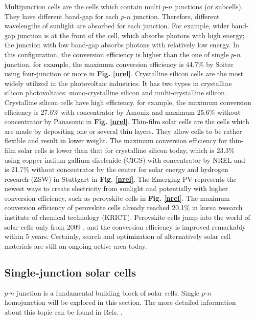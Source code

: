 \documentclass[a4paper, 12pt, titlepage,oneside,drop]{kthesis}
\begin{document}
Multijunction cells are the cells which contain multi $p$-$n$ junctions (or subcells). They have different band-gap for each $p$-$n$ junction.
Therefore, different wavelengths of sunlight are absorbed for each junction. For example, wider band-gap junction is at the front of the cell, which absorbs photons with high energy; the junction with 
low band-gap absorbs photons with relatively low energy. In this configuration, the conversion efficiency is higher than the one of single $p$-$n$ junction, for example, the maximum conversion efficiency is 44.7\% by Soitec \cite{dimroth2014wafer} using 
four-junction or more in \textbf{Fig. \ref{nrel}}. Crystalline silicon cells are the most widely utilized in the photovoltaic industries. It has two types in
crystalline silicon photovoltaics: mono-crystalline silicon and multi-crystalline silicon. Crystalline silicon cells have high efficiency, for example, the maximum conversion efficiency is 27.6\% with concentrator 
by Amonix \cite{jones2009new} and maximum 25.6\% without concentrator by Panasonic \cite{panasonic} in \textbf{Fig. \ref{nrel}}. Thin-film solar cells are the cells which are made by depositing one or several thin layers. 
They allow cells to be rather 
flexible and result in lower weight. The maximum conversion efficiency for thin-film solar cells is lower than that for crystalline silicon today, which is 23.3\% using copper indium gallium diselenide (CIGS) with concentrator by NREL \cite{ward2014cu} and 
is 21.7\% without concentrator by the center for solar energy and hydrogen research (ZSW) in Stuttgart \cite{zsw} in \textbf{Fig. \ref{nrel}}. The Emerging PV represents the newest ways to create electricity from
sunlight and potentially with higher conversion efficiency, such as perovskite cells in \textbf{Fig. \ref{nrel}}. The maximum conversion efficiency of perovskite cells already reached 20.1\% in korea research institute of chemical technology (KRICT)\cite{green2015solar}. 
Perovskite cells jump into the world of solar cells only from 2009 \cite{green2014emergence, mcgehee2014perovskite}, and the conversion efficiency is improved remarkably within 5 years. Certainly, search and optimization 
of alternatively solar cell materials are still an ongoing active area today.


\subsection{Single-junction solar cells}
$p$-$n$ junction is a fundamental building block of solar cells. Single $p$-$n$ homojunction will be explored in this section. The more detailed information about this topic can be found in Refs. \cite{bok1,sproul2003understanding, neamen2003semiconductor}.
\end{document}
